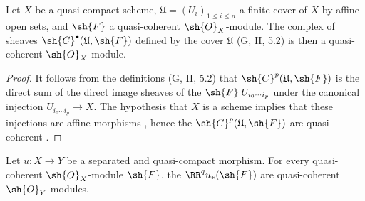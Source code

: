 \begin{lemma}[1.4.9]
\label{III.1.4.9}
Let $X$ be a quasi-compact scheme, $\mathfrak{U}=(U_i)_{1\leq i\leq n}$ a finite cover of $X$ by affine open sets, and $\sh{F}$ a quasi-coherent $\sh{O}_X$-module.
The complex of sheaves $\sh{C}^\bullet(\mathfrak{U},\sh{F})$ defined by the cover $\mathfrak{U}$ (G, II, 5.2) is then a quasi-coherent $\sh{O}_X$-module.
\end{lemma}

\begin{proof}
It follows from the definitions (G, II, 5.2) that $\sh{C}^p(\mathfrak{U},\sh{F})$ is the direct sum of the direct image sheaves of the $\sh{F}|U_{i_0\cdots i_p}$ under the canonical injection $U_{i_0\cdots i_p}\to X$.
The hypothesis that $X$ is a scheme implies that these injections are affine morphisms , hence the $\sh{C}^p(\mathfrak{U},\sh{F})$ are quasi-coherent .
\end{proof}

\begin{proposition}[1.4.10]
\label{III.1.4.10}
Let $u:X\to Y$ be a separated and quasi-compact morphism.
For every quasi-coherent $\sh{O}_X$-module $\sh{F}$, the $\RR^q u_*(\sh{F})$ are quasi-coherent $\sh{O}_Y$-modules.
\end{proposition}


